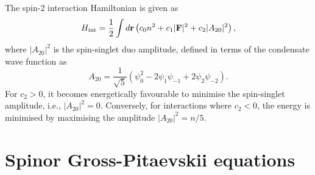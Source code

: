 The spin-2 interaction Hamiltonian is given as
\begin{equation}\label{eq: spin-2-interacting-Hamiltonian}
    H_\mathrm{int} = \frac{1}{2}\int d\vb{r}\left(c_0n^2+c_1|\vb{F}|^2
    +c_2|A_{20}|^2\right),
\end{equation}
where \(|A_{20}|^2\) is the spin-singlet duo amplitude, defined in terms of
the condensate wave function as
\begin{equation}\label{eq: spin-singlet-duo}
    A_{20} = \frac{1}{\sqrt{5}}\left(\psi_0^2-2\psi_1\psi_{-1}
    +2\psi_2\psi_{-2}\right).
\end{equation}
For \(c_2 > 0\), it becomes energetically favourable to minimise the
spin-singlet amplitude, i.e., \(|A_{20}|^2 = 0\).
Conversely, for interactions where \(c_2 < 0\), the energy is minimised by
maximising the amplitude \(|A_{20}|^2=n/5\).

\section{Spinor Gross-Pitaevskii equations}

